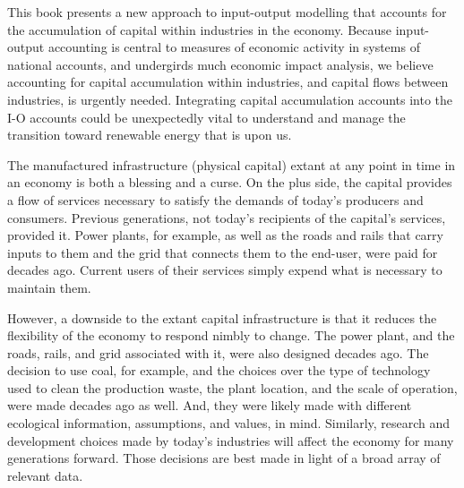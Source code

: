 


This book presents a new approach to input-output modelling that  
accounts for the accumulation of capital within industries in the economy.
Because input-output accounting is central to 
measures of economic activity in systems of national accounts, and 
undergirds much economic impact analysis\cite{Lawson1997}, we believe
accounting for capital accumulation within industries, and
capital flows between industries, is urgently needed. 
Integrating capital accumulation accounts into the 
I-O accounts could be unexpectedly vital  to understand and 
manage the transition toward renewable energy that is upon us. 


The manufactured  
infrastructure (physical capital)  extant at any point in time in an
economy is both a blessing and a curse. On the plus side, the capital provides a flow of 
services necessary to satisfy the demands of today's producers and consumers. 
Previous generations, not today's recipients of the capital's services, provided it. 
Power plants, for example,
 as well as the roads and rails that carry inputs to them and the grid that connects
them to the end-user, were paid for decades ago. Current users of their services
simply expend what is necessary to maintain them. 


However, a downside to the extant capital infrastructure is that it
reduces the flexibility of the economy to respond nimbly to change.
The power plant, and the roads, rails, and grid associated with it, were also 
designed decades ago. The decision to use coal, for example, and the choices over 
the type of  technology used to clean the production waste, the plant location, 
and the scale of  operation, were made decades ago as well.
And, they were likely made with different ecological information,
 assumptions, and values, in mind. Similarly, research and development choices 
made by today's industries will affect the economy for many generations
forward. Those decisions are best made in light of a broad array of relevant data.

